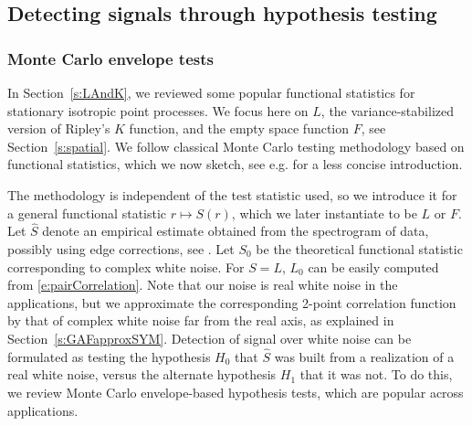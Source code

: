 
\subsection{Detecting signals through hypothesis testing}
\label{s:detection}

\subsubsection{Monte Carlo envelope tests}
\label{s:alpha}
In Section~\ref{s:LAndK}, we reviewed some popular functional statistics for
stationary isotropic point processes. We focus here on $L$, the
variance-stabilized version of Ripley's $K$ function, and the empty space
function $F$, see Section~\ref{s:spatial}. We follow classical Monte Carlo testing methodology
based on functional statistics, which we now sketch, see e.g. \citep{BDHLMN14}
for a less concise introduction. 

The methodology is independent of the test statistic used, so we introduce it
for a general functional statistic $r\mapsto S(r)$, which we later instantiate
to be $L$ or $F$. Let $\hat S$ denote an
empirical estimate obtained from the spectrogram of data, possibly using edge corrections, see \citep{MoWa03}.
Let $S_0$ be the theoretical functional statistic corresponding to complex white noise. For
$S=L$, $L_0$ can be easily computed from \eqref{e:pairCorrelation}. Note that
our noise is real white noise in the applications, but we approximate the corresponding
2-point correlation function by that of complex white noise far from the real axis, as explained in Section~\ref{s:GAFapproxSYM}. Detection of
signal over white noise can be formulated as testing the hypothesis $H_0$ that
$\hat S$ was built from a realization of a real white noise, versus the
alternate hypothesis $H_1$ that it was not. To do this, we review Monte Carlo
envelope-based hypothesis tests, which are popular across applications. 

